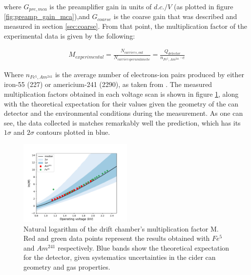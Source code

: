 where $G_{pre,mca}$ is the preamplifier gain in units of $d.c./V$ (as plotted in figure \ref{fig:preamp_gain_mca}),and $G_{coarse}$ is the coarse gain that was described and measured in section \ref{sec:coarse}. From that point, the multiplication factor of the experimental data is given by the following:

\begin{align}
  M_{experimental} = \frac{N_{carriers,out}}{N_{carriers per avalanche}} = \frac{Q_{detector}}{n_{Fe^{5},Am^{241}}\cdot e}
\end{align}

Where $n_{Fe^{5},Am^{241}}$ is the average number of electrons-ion pairs produced by either iron-55 (227) or americium-241 (2290), as taken from \cite{can_paper}. The measured multiplication factors obtained in each voltage scan is shown in figure \ref{final_lnm}, along with the theoretical expectation for their values given the geometry of the can detector and the environmental conditions during the measurement. As one can see, the data collected is matches remarkably well the prediction, which has its $1\sigma$ and $2\sigma$ contours plotted in blue.

\begin{figure}[htb!]
  \includegraphics[width=0.5\textwidth]{graphics/lnM_final_plot.pdf}
  \caption{Natural logarithm of the drift chamber's multiplication factor M. Red and green data points represent the results obtained with $Fe^{5}$ and $Am^{241}$ respectively. Blue bands show the theoretical expectation for the detector, given systematics uncertainties in the cider can geometry and gas properties.}
  \label{final_lnm}
\end{figure}

